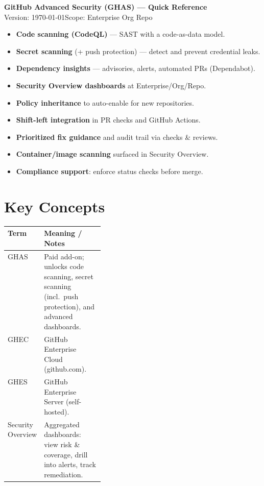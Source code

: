 \documentclass[10pt,a4paper]{article}
\begin{document}
\begin{center}
  {\Large\bfseries GitHub Advanced Security (GHAS) --- Quick Reference}\\[2pt]
  {\small Version: \today \quad\textbar\quad Scope: Enterprise \textrightarrow{} Org \textrightarrow{} Repo}
\end{center}

\vspace{0.5em}

\begin{ghascallout}
\begin{multicols}{2}
\begin{itemize}
  \item \textbf{Code scanning (CodeQL)} --- SAST with a code-as-data model.
  \item \textbf{Secret scanning} (+ push protection) --- detect and prevent credential leaks.
  \item \textbf{Dependency insights} --- advisories, alerts, automated PRs (Dependabot).
  \item \textbf{Security Overview dashboards} at Enterprise/Org/Repo.
  \item \textbf{Policy inheritance} to auto-enable for new repositories.
\end{itemize}
\columnbreak
\begin{itemize}
  \item \textbf{Shift-left integration} in PR checks and GitHub Actions.
  \item \textbf{Prioritized fix guidance} and audit trail via checks \& reviews.
  \item \textbf{Container/image scanning} surfaced in Security Overview.
  \item \textbf{Compliance support}: enforce status checks before merge.
\end{itemize}
\end{multicols}
\end{ghascallout}

\section{Key Concepts}

\begin{tabularx}{\linewidth}{@{}>{\raggedright\arraybackslash}p{0.22\linewidth}X@{}}
\toprule
\textbf{Term} & \textbf{Meaning / Notes}\\
\midrule
GHAS & Paid add-on; unlocks code scanning, secret scanning (incl.\ push protection), and advanced dashboards.\\
GHEC & GitHub Enterprise Cloud (github.com).\\
GHES & GitHub Enterprise Server (self-hosted).\\
Security Overview & Aggregated dashboards: view risk \& coverage, drill into alerts, track remediation.\\
\bottomrule
\end{tabularx}
\end{document}
